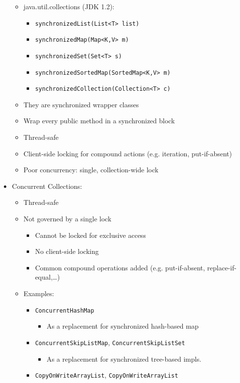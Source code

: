 \documentclass[a4paper]{article}
\newcommand{\inline}[1]{\lstinline!#1!}%
\begin{document}
\begin{itemize}
\begin{itemize}
\item java.util.collections (JDK 1.2):
\begin{itemize}
\item \inline{synchronizedList(List<T> list)}
\item \inline{synchronizedMap(Map<K,V> m)}
\item \inline{synchronizedSet(Set<T> s)}
\item \inline{synchronizedSortedMap(SortedMap<K,V> m)}
\item \inline{synchronizedCollection(Collection<T> c)}
\end{itemize}
\item They are synchronized wrapper classes
\item Wrap every public method in a synchronized block
\item Thread-safe
\item Client-side locking for compound actions (e.g. iteration, put-if-absent)
\item Poor concurrency: single, collection-wide lock
\end{itemize}
\item Concurrent Collections: 
\begin{itemize}
\item Thread-safe
\item Not governed by a single lock
\begin{itemize}
\item Cannot be locked for exclusive access
\item No client-side locking
\item Common compound operations added (e.g. put-if-absent, replace-if-equal,\dots)
\end{itemize}
\item Examples:
\begin{itemize}
\item \inline{ConcurrentHashMap} 
\begin{itemize}
\item As a replacement for synchronized hash-based map
\end{itemize}
\item \inline{ConcurrentSkipListMap}, \inline{ConcurrentSkipListSet}
\begin{itemize}
\item As a replacement for synchronized tree-based impls.
\end{itemize}
\item \inline{CopyOnWriteArrayList}, \inline{CopyOnWriteArrayList}
\begin{itemize}

\end{itemize}
\end{itemize}
\end{itemize}
\end{itemize}
\end{document}
